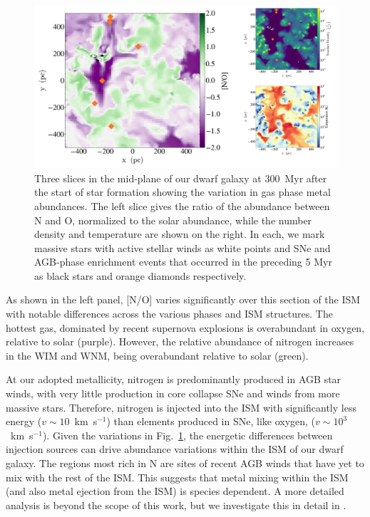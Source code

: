\begin{figure}
\includegraphics[width=0.98\linewidth]{figures/ch1/log_NO_panel}
\caption{Three slices in the mid-plane of our dwarf galaxy at 300~Myr after the start of star formation showing the variation in gas phase metal abundances. The left slice gives the ratio of the abundance between N and O, normalized to the solar abundance, while the number density and temperature are shown on the right. In each, we mark massive stars with active stellar winds as white points and SNe and AGB-phase enrichment events that occurred in the preceding 5 Myr as black stars and orange diamonds respectively.}
\label{ch1:fig:metal_slices}
\end{figure}

As shown in the left panel, [N/O] varies significantly over this section of the ISM with notable differences across the various phases and ISM structures. The hottest gas, dominated by recent supernova explosions is overabundant in oxygen, relative to solar (purple). However, the relative abundance of nitrogen increases in the WIM and WNM, being overabundant relative to solar (green).

At our adopted metallicity, nitrogen is predominantly produced in AGB star winds, with very little production in core collapse SNe and winds from more massive stars. Therefore, nitrogen is injected into the ISM with significantly less energy ($v \sim 10$~km~s$^{-1}$) than elements produced in SNe, like oxygen, ($v\sim 10^3$~km~s$^{-1}$). Given the variations in Fig.~\ref{ch1:fig:metal_slices}, the energetic differences between injection sources can drive abundance variations within the ISM of our dwarf galaxy. The regions most rich in N are sites of recent AGB winds that have yet to mix with the rest of the ISM. This suggests that metal mixing within the ISM (and also metal ejection from the ISM) is species dependent. A more detailed analysis is beyond the scope of this work, but we investigate this in detail in \cite{Emerick2018b}.

